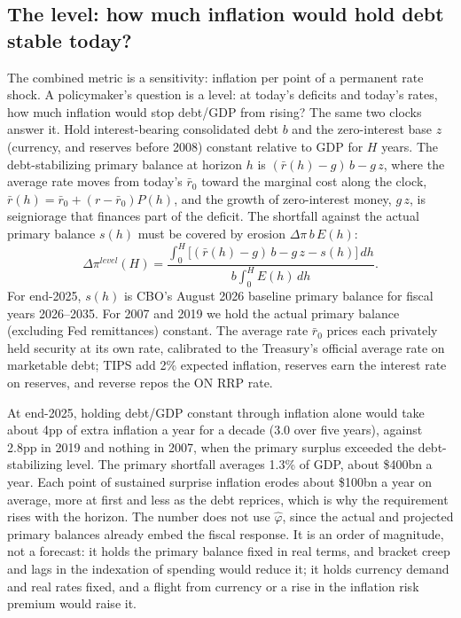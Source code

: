 \subsection{The level: how much inflation would hold debt stable today?}\label{sec:level}

The combined metric is a sensitivity: inflation per point of a permanent rate shock. A policymaker's question is a level: at today's deficits and today's rates, how much inflation would stop debt/GDP from rising? The same two clocks answer it. Hold interest-bearing consolidated debt $b$ and the zero-interest base $z$ (currency, and reserves before 2008) constant relative to GDP for $H$ years. The debt-stabilizing primary balance at horizon $h$ is $(\bar r(h)-g)\,b-g\,z$, where the average rate moves from today's $\bar r_0$ toward the marginal cost along the clock, $\bar r(h)=\bar r_0+(r-\bar r_0)P(h)$, and the growth of zero-interest money, $g\,z$, is seigniorage that finances part of the deficit. The shortfall against the actual primary balance $s(h)$ must be covered by erosion $\Delta\pi\,b\,E(h)$:
\begin{equation}
\Delta\pi^{level}(H)=\frac{\int_0^H\big[(\bar r(h)-g)\,b-g\,z-s(h)\big]\,dh}{b\int_0^H E(h)\,dh}.
\end{equation}
For end-2025, $s(h)$ is CBO's August 2026 baseline primary balance for fiscal years 2026--2035. For 2007 and 2019 we hold the actual primary balance (excluding Fed remittances) constant. The average rate $\bar r_0$ prices each privately held security at its own rate, calibrated to the Treasury's official average rate on marketable debt; TIPS add 2\% expected inflation, reserves earn the interest rate on reserves, and reverse repos the ON RRP rate.



At end-2025, holding debt/GDP constant through inflation alone would take about 4pp of extra inflation a year for a decade (3.0 over five years), against 2.8pp in 2019 and nothing in 2007, when the primary surplus exceeded the debt-stabilizing level. The primary shortfall averages 1.3\% of GDP, about \$400bn a year. Each point of sustained surprise inflation erodes about \$100bn a year on average, more at first and less as the debt reprices, which is why the requirement rises with the horizon. The number does not use $\hat\varphi$, since the actual and projected primary balances already embed the fiscal response. It is an order of magnitude, not a forecast: it holds the primary balance fixed in real terms, and bracket creep and lags in the indexation of spending would reduce it; it holds currency demand and real rates fixed, and a flight from currency or a rise in the inflation risk premium would raise it.
